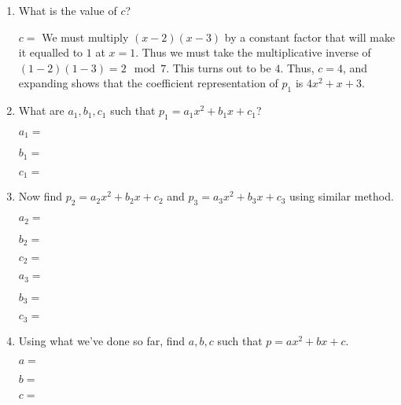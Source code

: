 \documentclass[11pt, preview]{standalone} %
\begin{document}
\begin{enumerate}
\begin{enumerate}
\item What is the value of $c$?
\begin{Freeform}{4}
$c = $
\Solution We must multiply $(x-2)(x-3)$ by a constant factor that will make it equalled to $1$ at $x=1$. Thus we must take the multiplicative inverse of $(1-2)(1-3) = 2 \mod 7$. This turns out to be $4$. Thus, $c = 4$, and expanding shows that the coefficient representation of $p_1$ is $4x^2+x+3$.
\end{Freeform}

\item What are $a_1, b_1, c_1$ such that $p_1 = a_1x^2 + b_1x + c_1$?
\begin{Freeform}{4}
$a_1=$
\end{Freeform}
\begin{Freeform}{1}
$b_1=$
\end{Freeform}
\begin{Freeform}{3}
$c_1=$
\end{Freeform}

\item Now find $p_2 = a_2x^2 + b_2x + c_2$ and $p_3 = a_3x^2 + b_3x + c_3$ using similar method.
\begin{Freeform}{6}
$a_2=$
\end{Freeform}
\begin{Freeform}{4}
$b_2=$
\end{Freeform}
\begin{Freeform}{4}
$c_2=$
\end{Freeform}

\begin{Freeform}{4}
$a_3=$
\end{Freeform}
\begin{Freeform}{2}
$b_3=$
\end{Freeform}
\begin{Freeform}{1}
$c_3=$
\end{Freeform}

\item Using what we've done so far, find $a, b, c$ such that $p = ax^2 + bx + c$.
\begin{Freeform}{2}
$a=$
\end{Freeform}
\begin{Freeform}{0}
$b=$
\end{Freeform}
\begin{Freeform}{0}
$c=$
\end{Freeform}
\end{enumerate}


\end{enumerate}
\end{document}
